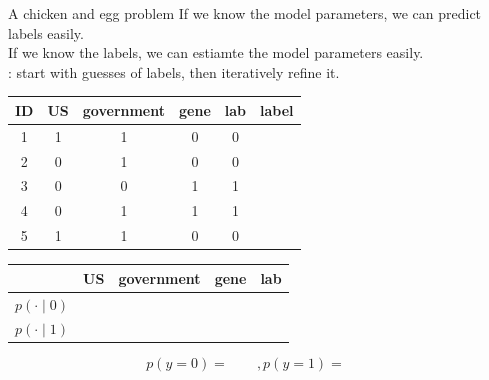 \documentclass[usenames,dvipsnames,notes,11pt,aspectratio=169]{beamer}
\begin{document}
\begin{frame}
    {A chicken and egg problem}
    If we know the model parameters, we can predict labels easily.\\
    If we know the labels, we can estiamte the model parameters easily.\\
    : start with guesses of labels, then iteratively refine it.
    \vspace{-1em}
    \begin{table}
        \begin{tabular}{c|ccccc}
            ID & US & government & gene & lab & label \\
            \midrule
            1 & 1 & 1 & 0 & 0 &  \\
            2 & 0 & 1 & 0 & 0 &  \\
            3 & 0 & 0 & 1 & 1 &  \\
            4 & 0 & 1 & 1 & 1 &  \\
            5 & 1 & 1 & 0 & 0 & 
        \end{tabular}

        \begin{tabular}{c|cccc}
            & US & government & gene & lab \\
             \midrule
            $p(\cdot\mid 0)$ &&&&\\ %
            $p(\cdot\mid 1)$ &&&& %
        \end{tabular}
    \end{table}
        $$
        p(y=0) = \qquad, p(y=1) = \qquad
        $$
\end{frame}
\end{document}
